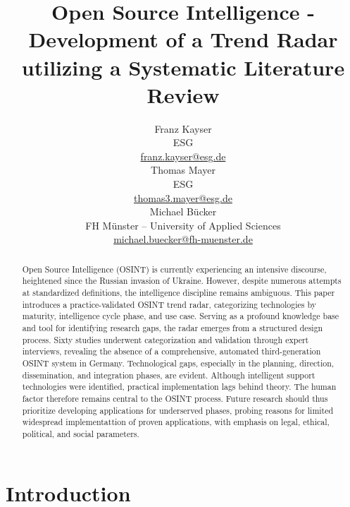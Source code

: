\documentclass[10pt]{article}
\title{Open Source Intelligence - Development of a Trend Radar utilizing a Systematic Literature Review}
\author{Franz Kayser \\
  ESG \\
  {\underline{ franz.kayser@esg.de}} \\\And
  Thomas Mayer \\
  ESG  \\
  {\underline{ thomas3.mayer@esg.de} }\\\And 
  Michael Bücker \\
  FH Münster -- University of Applied Sciences\\
  {\underline{michael.buecker@fh-muenster.de}} \\}
\date{}
\begin{document}
\maketitle
\begin{abstract}


    Open Source Intelligence (OSINT) is currently experiencing an intensive discourse, heightened since the Russian invasion of Ukraine. However, despite numerous attempts at standardized definitions, the intelligence discipline remains ambiguous. This paper introduces a practice-validated OSINT trend radar, categorizing technologies by maturity, intelligence cycle phase, and use case. Serving as a profound knowledge base and tool for identifying research gaps, the radar emerges from a structured design process. Sixty studies underwent categorization and validation through expert interviews, revealing the absence of a comprehensive, automated third-generation OSINT system in Germany. Technological gaps, especially in the planning, direction, dissemination, and integration phases, are evident. Although intelligent support technologies were identified, practical implementation lags behind theory. The human factor therefore remains central to the OSINT process. Future research should thus prioritize developing applications for underserved phases, probing reasons for limited widespread implementattion of proven applications, with emphasis on legal, ethical, political, and social parameters.


\end{abstract}

\section{Introduction}
\end{document}
